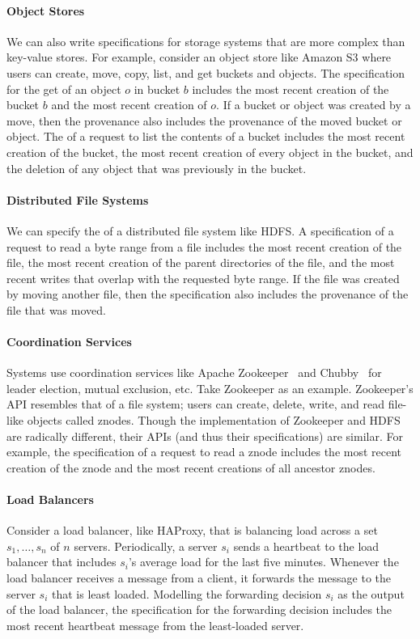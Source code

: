\paragraph{Object Stores}
We can also write \watprovenance{} specifications for storage systems that are
more complex than key-value stores. For example, consider an object store like
Amazon S3 where users can create, move, copy, list, and get buckets and
objects. The \watprovenance{} specification for the get of an object $o$ in
bucket $b$ includes the most recent creation of the bucket $b$ and the most
recent creation of $o$. If a bucket or object was created by a move, then the
provenance also includes the provenance of the moved bucket or object. The
\watprovenance{} of a request to list the contents of a bucket includes the
most recent creation of the bucket, the most recent creation of every object in
the bucket, and the deletion of any object that was previously in the bucket.

\paragraph{Distributed File Systems}
We can specify the \watprovenance{} of a distributed file system like HDFS. A
\watprovenance{} specification of a request to read a byte range from a file
includes the most recent creation of the file, the most recent creation of the
parent directories of the file, and the most recent writes that overlap with
the requested byte range. If the file was created by moving another file, then
the \watprovenance{} specification also includes the provenance of the file
that was moved.

\paragraph{Coordination Services}
Systems use coordination services like Apache
Zookeeper~\cite{hunt2010zookeeper} and Chubby~\cite{burrows2006chubby} for
leader election, mutual exclusion, etc. Take Zookeeper as an example.
Zookeeper's API resembles that of a file system; users can create, delete,
write, and read file-like objects called znodes. Though the implementation of
Zookeeper and HDFS are radically different, their APIs (and thus their
\watprovenance{} specifications) are similar. For example, the \watprovenance{}
specification of a request to read a znode includes the most recent creation of
the znode and the most recent creations of all ancestor znodes.

\paragraph{Load Balancers}
Consider a load balancer, like HAProxy, that is balancing load across a set
$s_1, \ldots, s_n$ of $n$ servers. Periodically, a server $s_i$ sends a
heartbeat to the load balancer that includes $s_i$'s average load for the last
five minutes. Whenever the load balancer receives a message from a client, it
forwards the message to the server $s_i$ that is least loaded. Modelling the
forwarding decision $s_i$ as the output of the load balancer, the
\watprovenance{} specification for the forwarding decision includes the most
recent heartbeat message from the least-loaded server.


